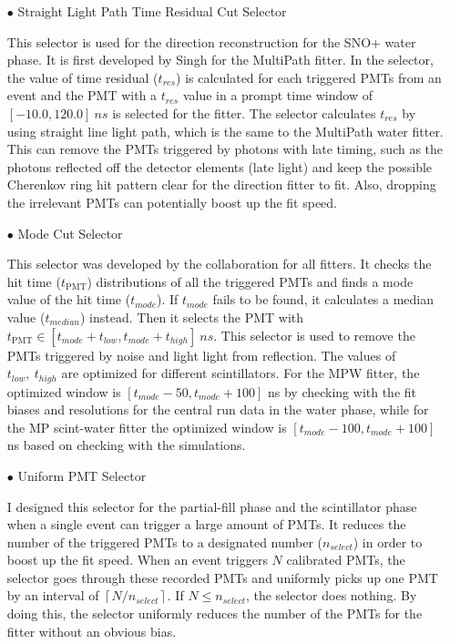 \begin{itemize}
	\item[$\bullet$] Straight Light Path Time Residual Cut Selector
	
	This selector is used for the direction reconstruction for the SNO+ water phase. It is first developed by Singh for the MultiPath fitter. In the selector, the value of time residual ($t_{res}$) is calculated for each triggered PMTs from an event and the PMT with a $t_{res}$ value in a prompt time window of $[-10.0, 120.0]~ns$ is selected for the fitter. The selector calculates $t_{res}$ by using straight line light path, which is the same to the MultiPath water fitter. This can remove the PMTs triggered by photons with late timing, such as the photons reflected off the detector elements (late light) and keep the possible Cherenkov ring hit pattern clear for the direction fitter to fit. Also, dropping the irrelevant PMTs can potentially boost up the fit speed.
	
	\item[$\bullet$] Mode Cut Selector
	
	This selector was developed by the collaboration for all fitters. It checks the hit time ($t_\mathrm{PMT}$) distributions of all the triggered PMTs and finds a mode value of the hit time ($t_{mode}$). If $t_{mode}$ fails to be found, it calculates a median value ($t_{median}$) instead\cite{modeCut}. Then it selects the PMT with $t_\mathrm{PMT} \in [t_{mode}+t_{low}, t_{mode}+t_{high}]~ns$. This selector is used to remove the　PMTs triggered by noise and light light from reflection. The values of $t_{low},~t_{high}$ are optimized for different scintillators. For the MPW fitter, the optimized window is $[t_{mode}-50, t_{mode}+100]$ ns by checking with the fit biases and resolutions for the  central run data in the water phase, while for the MP scint-water fitter the optimized window is $[t_{mode}-100, t_{mode}+100]$ ns based on checking with the simulations.
	
	\item[$\bullet$] Uniform PMT Selector
	
	I designed this selector for the partial-fill phase and the scintillator phase when a single event can trigger a large amount of PMTs. It reduces the number of the triggered PMTs to a designated number ($n_{select}$) in order to boost up the fit speed. When an event triggers $N$ calibrated PMTs, the selector goes through these recorded PMTs and uniformly picks up one PMT by an interval of $\left \lceil{N/n_{select}}\right \rceil $. If $N\leq n_{select}$, the selector does nothing. By doing this, the selector uniformly reduces the number of the PMTs for the fitter without an obvious bias.
	

\end{itemize}
